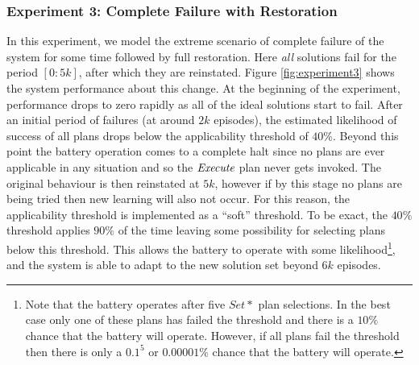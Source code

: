 %

\subsubsection{Experiment 3: Complete Failure with Restoration}

In this experiment, we model the extreme scenario of complete failure of the system for some time followed by full restoration. Here {\em all} solutions fail for the period $[0:5k]$, after which they are reinstated. Figure \ref{fig:experiment3} shows the system performance about this change. At the beginning of the experiment, performance drops to zero rapidly as all of the ideal solutions start to fail. After an initial period of failures (at around $2k$ episodes), the estimated likelihood of success of all plans drops below the applicability threshold of $40\%$. Beyond this point the battery operation comes to a complete halt since no plans are ever applicable in any situation and so the $\operatorname{\textit{Execute}}$ plan never gets invoked. The original behaviour is then reinstated at $5k$, however if by this stage no plans are being tried then new learning will also not occur. For this reason, the applicability threshold is implemented as a ``soft'' threshold. To be exact, the $40\%$ threshold applies $90\%$ of the time leaving some possibility for selecting plans below this threshold. This allows the battery to operate with some likelihood\footnote{Note that the battery operates after five $Set*$ plan selections. In the best case only one of these plans has failed the threshold and there is a $10\%$ chance that the battery will operate. However, if all plans fail the threshold then there is only a $0.1^5$ or $0.00001\%$ chance that the battery will operate.}, and the system is able to adapt to the new solution set beyond $6k$ episodes.


%
